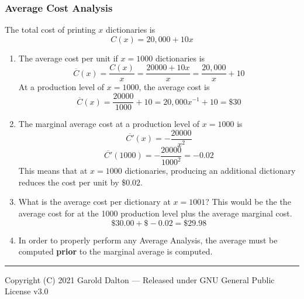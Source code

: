 \documentclass[14pt]{extarticle}
\begin{document}
\subsubsection{Average Cost Analysis}
The total cost of printing $x$ dictionaries is
$$C(x) = 20,000+ 10x$$
\begin{enumerate}
	\item The average cost per unit if $x=1000$ dictionaries is $$\overline{C}(x) = \frac{C(x)}{x}= \frac{20000+10x}{x} = \frac{20,000}{x} + 10$$
	At a production level of $x=1000$, the average cost is
	$$\overline{C}(x)=\frac{20000}{1000} + 10 = 20,000x^{-1}+ 10 =\$30$$
	\item The marginal average cost at a production level of $x=1000$ is 
	$$\overline{C'}(x)= -\frac{20000}{x^2} $$
	$$ \overline{C'}(1000)=-\frac{20000}{1000^2}=-0.02$$
	This means that at $x=1000$ dictionaries, producing an additional dictionary reduces the cost per unit by $\$0.02$.
	\item What is the average cost per dictionary at $x=1001$? This would be the the average cost for at the 1000 production level plus the average marginal cost.
	$$\$30.00 + \$-0.02 = \$29.98$$
	\item In order to properly perform any Average Analysis, the average must be computed \textbf{prior} to the marginal average is computed.
\end{enumerate}





\noindent\rule{\textwidth}{1pt}
{\footnotesize Copyright (C) 2021 Garold Dalton --- Released under GNU General Public License v3.0}


\cleardoublepage
\end{document}
